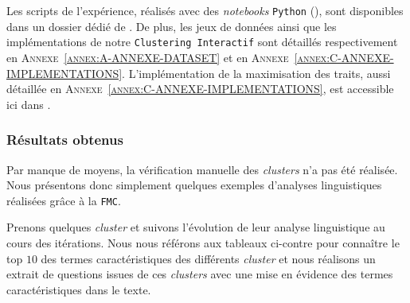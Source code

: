 			\begin{leftBarInformation}
				Les scripts de l'expérience, réalisés avec des \textit{notebooks} \texttt{Python} (\cite{van-rossum-drake:2009:python-reference-manual}), sont disponibles dans un dossier dédié de \cite{schild:2021:cognitivefactory-interactiveclusteringcomparativestudy}.
				De plus, les jeux de données ainsi que les implémentations de notre \texttt{Clustering Interactif} sont détaillés respectivement en \textsc{Annexe~\ref{annex:A-ANNEXE-DATASET}} et en \textsc{Annexe~\ref{annex:C-ANNEXE-IMPLEMENTATIONS}}.
				L'implémentation de la maximisation des traits, aussi détaillée en \textsc{Annexe~\ref{annex:C-ANNEXE-IMPLEMENTATIONS}}, est accessible ici dans \cite{schild:2023:cognitivefactory-featuresmaximizationmetric}.
			\end{leftBarInformation}

		\subsubsection{Résultats obtenus}
			
			\begin{leftBarWarning}
				Par manque de moyens, la vérification manuelle des \textit{clusters} n'a pas été réalisée.
				Nous présentons donc simplement quelques exemples d'analyses linguistiques réalisées grâce à la \texttt{FMC}.
			\end{leftBarWarning}
			
			Prenons quelques \textit{cluster} et suivons l'évolution de leur analyse linguistique au cours des itérations.
			Nous nous référons aux tableaux ci-contre pour connaître le top $10$ des termes caractéristiques des différents \textit{cluster} et nous réalisons un extrait de questions issues de ces \textit{clusters} avec une mise en évidence des termes caractéristiques dans le texte.
			
